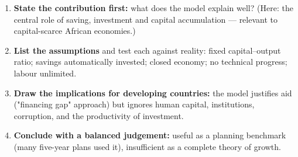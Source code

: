 \documentclass[11pt]{article}
\begin{document}
\begin{methode}
\begin{enumerate}
\item \textbf{State the contribution first:} what does the model explain well? (Here: the central role of saving, investment and capital accumulation — relevant to capital-scarce African economies.)
\item \textbf{List the assumptions} and test each against reality: fixed capital--output ratio; savings automatically invested; closed economy; no technical progress; labour unlimited.
\item \textbf{Draw the implications for developing countries:} the model justifies aid ("financing gap" approach) but ignores human capital, institutions, corruption, and the productivity of investment.
\item \textbf{Conclude with a balanced judgement:} useful as a planning benchmark (many five-year plans used it), insufficient as a complete theory of growth.
\end{enumerate}
\end{methode}
\end{document}
